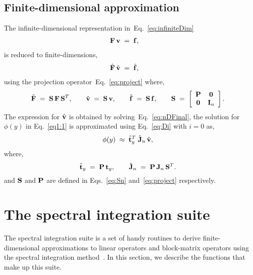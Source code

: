 \documentclass[%
secnumarabic,%
 amssymb, amsmath,%
 aps,prf,superscriptaddress,longbibliography
frontmatterverbose,
]{revtex4-2}
\begin{document}
\subsection{Finite-dimensional approximation}
The infinite-dimensional representation in~Eq.~\eqref{eq:infiniteDim}
  \begin{align}
    \mathbf{F} \,\mathbf{v}\;&=\; \mathbf{f},
  \end{align}
is reduced to finite-dimensions,
\begin{align}\label{eq:nDFinal}
    \hat{\mathbf{F}} \,\hat{\mathbf{v}}\;&=\; \hat{\mathbf{f}},
  \end{align}
  using the projection operator~Eq.~\eqref{eq:project} where,
  \begin{equation}\label{eq:Sn}
    \hat{\mathbf{F}} \;=\;  \mathbf{S} \,\mathbf{F} \,\mathbf{S}^T, \qquad \hat{\mathbf{v}} \;=\; \mathbf{S}\, \mathbf{v}, \qquad \hat{\mathbf{f}} \;=\; \mathbf{S}\, \mathbf{f}, \qquad \mathbf{S} \;=\; \left[\begin{array}{cc}
    \mathbf{P} & \mathbf 0 \\
    \mathbf 0 & \mathbf{I}_n
    \end{array}\right] .
  \end{equation}
The expression for $\hat{\mathbf{v}}$ is obtained by solving~Eq.~\eqref{eq:nDFinal}, the solution for $\phi (y)$ in Eq.~\eqref{eq1:1} is approximated using Eq.~\eqref{eq:Di} with $i = 0$ as,
$$
\phi (y) \;\approx\; \hat{\mathbf{t}}_y^T \; \hat{\mathbf{J}}_n\, \hat{\mathbf{v}},
$$ 
where,
$$
\hat{\mathbf{t}}_y \;=\; \mathbf{P}\,\mathbf{t}_y, \qquad \hat {\mathbf{J}}_n \;=\; \mathbf{P} \,\mathbf J_n\, \mathbf{S}^T.
$$
and $\mathbf{S}$ and $\mathbf{P}$ are defined in Eqs.~\eqref{eq:Sn} and~\eqref{eq:project} respectively.
\section{The spectral integration suite}
The spectral integration suite is a set of handy routines to derive finite-dimensional approximations to linear operators and block-matrix operators using the spectral integration method~\cite{DuSIAM2016,GreSIAM91}. In this section, we describe the functions that make up this suite. 
\end{document}
